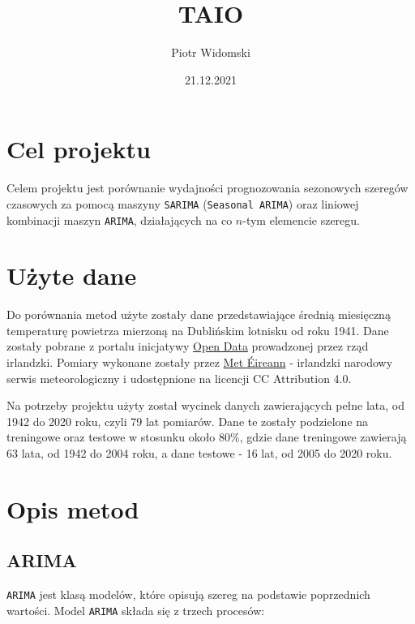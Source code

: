 \documentclass[12pt]{article}
\title{TAIO}
\author{Piotr Widomski}
\date{21.12.2021}
\begin{document}
\maketitle

\section{Cel projektu}

Celem projektu jest porównanie wydajności prognozowania sezonowych szeregów czasowych za pomocą maszyny \texttt{SARIMA} (\texttt{Seasonal ARIMA}) oraz liniowej kombinacji maszyn \texttt{ARIMA}, działających na co $n$-tym elemencie szeregu.

\section{Użyte dane}

Do porównania metod użyte zostały dane przedstawiające średnią miesięczną temperaturę powietrza mierzoną na Dublińskim lotnisku od roku 1941. Dane zostały pobrane z portalu inicjatywy \href{https://data.gov.ie/dataset/dublin-airport-monthly-data?package_type=dataset}{Open Data} prowadzonej przez rząd irlandzki. Pomiary wykonane zostały przez \href{https://www.met.ie/}{Met Éireann} - irlandzki narodowy serwis meteorologiczny i udostępnione na licencji CC Attribution 4.0.

Na potrzeby projektu użyty został wycinek danych zawierających pełne lata, od 1942 do 2020 roku, czyli 79 lat pomiarów. Dane te zostały podzielone na treningowe oraz testowe w stosunku około $80\%$, gdzie dane treningowe zawierają 63 lata, od 1942 do 2004 roku, a dane testowe - 16 lat, od 2005 do 2020 roku.

\section{Opis metod}

\subsection{ARIMA}

\texttt{ARIMA} jest klasą modelów, które opisują szereg na podstawie poprzednich wartości. Model \texttt{ARIMA} składa się z trzech procesów:
\end{document}
